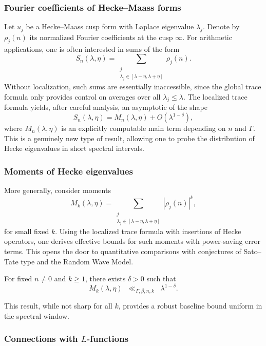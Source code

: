 \subsubsection{Fourier coefficients of Hecke–Maass forms}

Let $u_j$ be a Hecke–Maass cusp form with Laplace eigenvalue $\lambda_j$. Denote by $\rho_j(n)$ its normalized Fourier coefficients at the cusp $\infty$. For arithmetic applications, one is often interested in sums of the form
\[
S_n(\lambda,\eta) = \sum_{\substack{j \\ \lambda_j \in [\lambda-\eta,\lambda+\eta]}} \rho_j(n).
\]
Without localization, such sums are essentially inaccessible, since the global trace formula only provides control on averages over all $\lambda_j \leq \lambda$. The localized trace formula yields, after careful analysis, an asymptotic of the shape
\[
S_n(\lambda,\eta) = M_{n}(\lambda,\eta) + O(\lambda^{1-\delta}),
\]
where $M_{n}(\lambda,\eta)$ is an explicitly computable main term depending on $n$ and $\Gamma$. This is a genuinely new type of result, allowing one to probe the distribution of Hecke eigenvalues in short spectral intervals.

\subsubsection{Moments of Hecke eigenvalues}

More generally, consider moments
\[
M_k(\lambda,\eta) = \sum_{\substack{j \\ \lambda_j \in [\lambda-\eta,\lambda+\eta]}} |\rho_j(n)|^k,
\]
for small fixed $k$. Using the localized trace formula with insertions of Hecke operators, one derives effective bounds for such moments with power-saving error terms. This opens the door to quantitative comparisons with conjectures of Sato–Tate type and the Random Wave Model.

\begin{theorem}\label{thm:moments}
For fixed $n \neq 0$ and $k \geq 1$, there exists $\delta > 0$ such that
\[
M_k(\lambda,\eta) \;\;\ll_{\Gamma,\beta,n,k}\;\; \lambda^{1-\delta}.
\]
\end{theorem}

This result, while not sharp for all $k$, provides a robust baseline bound uniform in the spectral window.

\subsubsection{Connections with $L$-functions}

